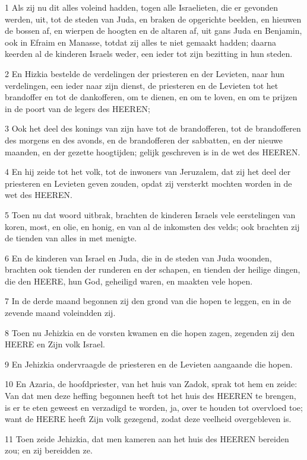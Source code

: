 \par 1 Als zij nu dit alles voleind hadden, togen alle Israelieten, die er gevonden werden, uit, tot de steden van Juda, en braken de opgerichte beelden, en hieuwen de bossen af, en wierpen de hoogten en de altaren af, uit gans Juda en Benjamin, ook in Efraim en Manasse, totdat zij alles te niet gemaakt hadden; daarna keerden al de kinderen Israels weder, een ieder tot zijn bezitting in hun steden.
\par 2 En Hizkia bestelde de verdelingen der priesteren en der Levieten, naar hun verdelingen, een ieder naar zijn dienst, de priesteren en de Levieten tot het brandoffer en tot de dankofferen, om te dienen, en om te loven, en om te prijzen in de poort van de legers des HEEREN;
\par 3 Ook het deel des konings van zijn have tot de brandofferen, tot de brandofferen des morgens en des avonds, en de brandofferen der sabbatten, en der nieuwe maanden, en der gezette hoogtijden; gelijk geschreven is in de wet des HEEREN.
\par 4 En hij zeide tot het volk, tot de inwoners van Jeruzalem, dat zij het deel der priesteren en Levieten geven zouden, opdat zij versterkt mochten worden in de wet des HEEREN.
\par 5 Toen nu dat woord uitbrak, brachten de kinderen Israels vele eerstelingen van koren, most, en olie, en honig, en van al de inkomsten des velds; ook brachten zij de tienden van alles in met menigte.
\par 6 En de kinderen van Israel en Juda, die in de steden van Juda woonden, brachten ook tienden der runderen en der schapen, en tienden der heilige dingen, die den HEERE, hun God, geheiligd waren, en maakten vele hopen.
\par 7 In de derde maand begonnen zij den grond van die hopen te leggen, en in de zevende maand voleindden zij.
\par 8 Toen nu Jehizkia en de vorsten kwamen en die hopen zagen, zegenden zij den HEERE en Zijn volk Israel.
\par 9 En Jehizkia ondervraagde de priesteren en de Levieten aangaande die hopen.
\par 10 En Azaria, de hoofdpriester, van het huis van Zadok, sprak tot hem en zeide: Van dat men deze heffing begonnen heeft tot het huis des HEEREN te brengen, is er te eten geweest en verzadigd te worden, ja, over te houden tot overvloed toe; want de HEERE heeft Zijn volk gezegend, zodat deze veelheid overgebleven is.
\par 11 Toen zeide Jehizkia, dat men kameren aan het huis des HEEREN bereiden zou; en zij bereidden ze.
